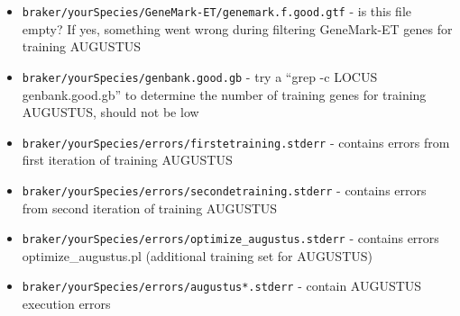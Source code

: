 \documentclass[a4paper,10pt]{report}
\begin{document}
\begin{itemize}
 \item  \texttt{braker/yourSpecies/GeneMark-ET/genemark.f.good.gtf} - is this file empty? If yes, something went
                                                        wrong during filtering GeneMark-ET genes 
                                                        for training AUGUSTUS
 
 \item  \texttt{braker/yourSpecies/genbank.good.gb} - try a ``grep -c LOCUS genbank.good.gb'' to determine the 
                                        number of training genes for training AUGUSTUS, should not
                                        be low

 \item  \texttt{braker/yourSpecies/errors/firstetraining.stderr} - contains errors from first iteration of 
                                                     training AUGUSTUS
 \item  \texttt{braker/yourSpecies/errors/secondetraining.stderr} - contains errors from second iteration of
                                                      training AUGUSTUS
   \item \texttt{braker/yourSpecies/errors/optimize\_augustus.stderr} - contains errors optimize\_augustus.pl 
                                                        (additional training set for AUGUSTUS)

 \item  \texttt{braker/yourSpecies/errors/augustus*.stderr} - contain AUGUSTUS execution errors

\end{itemize}




\end{document}
